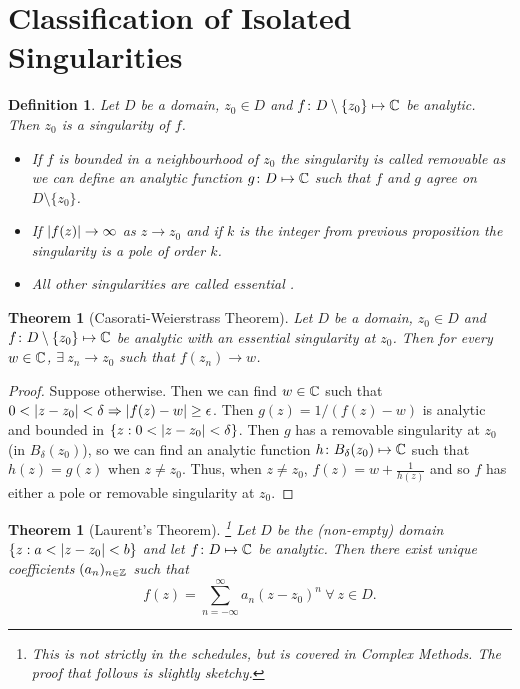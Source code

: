 \documentclass{notes}
\theoremstyle{plain}
\newtheorem{theorem}[proposition]{Theorem}
\newtheorem{definition}[proposition]{Definition}
\begin{document}
\section{Classification of Isolated Singularities}

\begin{definition}
Let $D$ be a domain, $z_0 \in D$ and $f \colon D \setminus \{ z_0 \} \mapsto \mathbb{C}$
be analytic.  Then $z_0$ is a singularity of $f$.

\begin{itemize}
\item If $f$ is bounded in a neighbourhood of $z_0$ the singularity is called
removable as we can define an analytic
function $g \colon D \mapsto \mathbb{C}$ such that $f$ and $g$ agree on
$D \setminus \{ z_0 \}$.
\item If $\left|f(z)\right| \rightarrow \infty$ as $z \rightarrow z_0$ and if
$k$ is the integer from previous proposition the singularity is a pole%
 of order $k$.
\item All other singularities are called essential%
.
\end{itemize}
\end{definition}

\begin{theorem}[Casorati-Weierstrass Theorem]%
Let $D$ be a domain, $z_0 \in D$ and $f \colon D \setminus \{ z_0 \} \mapsto \mathbb{C}$
be analytic with an essential singularity at $z_0$.  Then for every $w \in \mathbb{C}$,
$\exists\ z_n \rightarrow z_0$ such that $f(z_n) \rightarrow w$.
\end{theorem}

\begin{proof}
Suppose otherwise.  Then we can find $w \in \mathbb{C}$ such that $0 < \left|z-z_0\right| <
\delta \Rightarrow \left|f(z)-w\right| \ge \epsilon$.  Then $g(z) = 1/(f(z)-w)$ is
analytic and bounded in $\{ z : 0 < \left|z-z_0\right| <\delta\}$.  Then $g$ has a
removable singularity at $z_0$ (in $B_\delta(z_0)$), so we can find an
analytic function $h \colon B_\delta(z_0) \mapsto \mathbb{C}$ such that $h(z) = g(z)$
when $z \neq z_0$.  Thus, when $z \neq z_0$, $f(z) = w + \frac{1}{h(z)}$ and
so $f$ has either a pole or removable singularity at $z_0$.
\end{proof}

\begin{theorem}[Laurent's Theorem]%
%
\footnote{This is not strictly in the schedules, but is covered in Complex
Methods.  The proof that follows is slightly sketchy.}
Let $D$ be the (non-empty) domain
$\{ z : a < \left|z-z_0\right| < b \}$ and let $f \colon D \mapsto
\mathbb{C}$ be analytic.  Then there exist unique coefficients $(a_n)_{n \in \mathbb{Z}}$
such that
\[
f(z) = \sum_{n=-\infty}^\infty a_n (z-z_0)^n\ \forall\ z \in D.
\]
\end{theorem}
\end{document}
